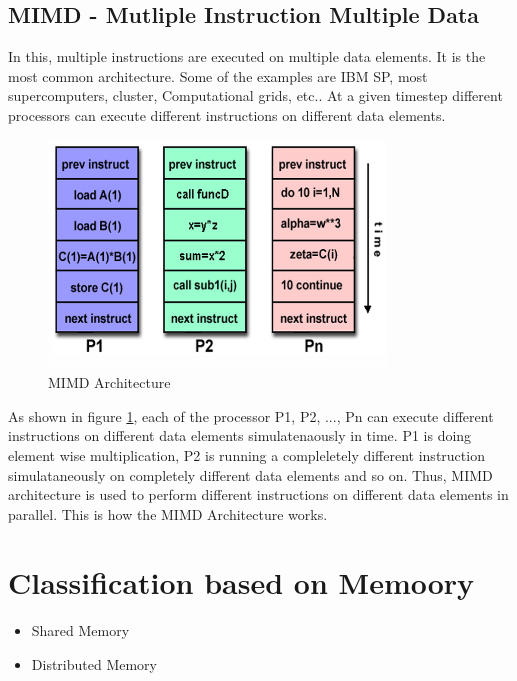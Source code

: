 \documentclass[12pt]{article}
\begin{document}
\subsection{MIMD - Mutliple Instruction Multiple Data}
In this, multiple instructions are executed on multiple data elements. It is the most common architecture.
Some of the examples are IBM SP, most supercomputers, cluster, Computational grids, etc..
At a given timestep different processors can execute different instructions on different data elements.
\begin{figure}[H]
    \centering
    \includegraphics[width=0.8\textwidth]{images/mimd.png}
    \caption{MIMD Architecture}
    \label{fig:mimd}
\end{figure}
As shown in figure \ref{fig:mimd}, each of the processor P1, P2, ..., Pn can execute different instructions on different data elements simulatenaously in time.
P1 is doing element wise multiplication, P2 is running a compleletely different instruction simulataneously on completely different data elements and so on.
Thus, MIMD architecture is used to perform different instructions on different data elements in parallel. This is how the MIMD Architecture works.

\section{Classification based on Memoory}
\begin{itemize}
    \item Shared Memory
    \item Distributed Memory
\end{itemize}
\end{document}
